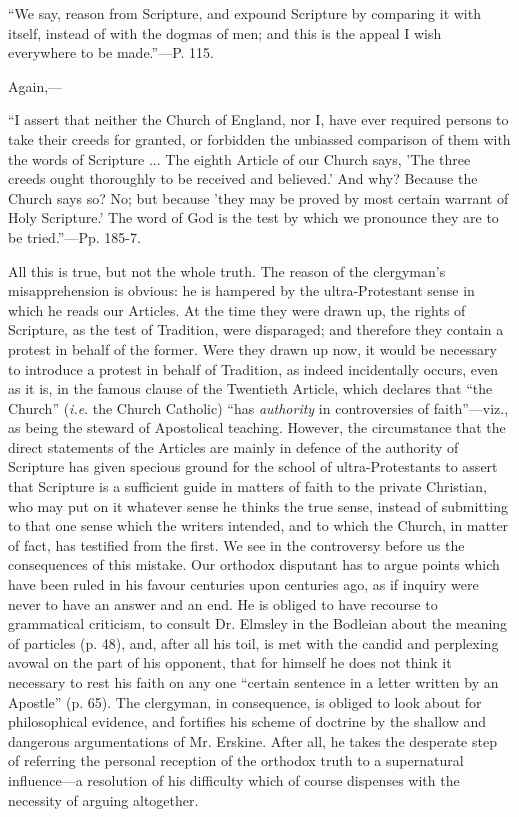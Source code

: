 ``We
say, reason from Scripture, and expound Scripture by comparing it with
itself, instead of with the dogmas of men; and this is the appeal I
wish everywhere to be made.''—P. 115.

Again,—

``I
assert that neither the Church of England, nor I, have ever required
persons to take their creeds for granted, or forbidden the unbiassed
comparison of them with the words of Scripture ... The eighth Article
of our Church says, 'The three creeds ought thoroughly to be received
and believed.' And why? Because the Church says so? No; but because
'they may be proved by most certain warrant of Holy Scripture.' The
word of God is the test by which we pronounce they are to be tried.''—Pp.
185-7.

All this is true, but not the whole truth. The
reason of the clergyman's misapprehension is obvious: he is hampered
by the ultra-Protestant sense in which he reads our Articles. At the
time they were drawn up, the rights of Scripture, as the test of
Tradition, were disparaged; and therefore they contain a protest in
behalf of the former. Were they drawn up now, it would be necessary to
introduce a protest in behalf of Tradition, as indeed incidentally
occurs, even as it is, in the famous clause of the Twentieth Article,
which declares that ``the Church'' (\emph{i.e}. the Church Catholic) ``has
\emph{authority} in controversies of faith''—viz., as being the
steward of Apostolical teaching. However, the circumstance that
the direct statements of the Articles are mainly in defence of the
authority of Scripture has given specious ground for the school of
ultra-Protestants to assert that Scripture is a sufficient guide in
matters of faith to the private Christian, who may put on it whatever
sense he thinks the true sense, instead of submitting to that one
sense which the writers intended, and to which the Church, in matter
of fact, has testified from the first. We see in the controversy
before us the consequences of this mistake. Our orthodox disputant has
to argue points which have been ruled in his favour centuries upon
centuries ago, as if inquiry were never to have an answer and an end.
He is obliged to have recourse to grammatical criticism, to consult
Dr. Elmsley in the Bodleian about the meaning of particles (p. 48),
and, after all his toil, is met with the candid and perplexing avowal
on the part of his opponent, that for himself he does not think it
necessary to rest his faith on any one ``certain sentence in a letter
written by an Apostle'' (p. 65). The clergyman, in consequence, is
obliged to look about for philosophical evidence, and fortifies his
scheme of doctrine by the shallow and dangerous argumentations of Mr.
Erskine. After all, he takes the desperate step of referring the
personal reception of the orthodox truth to a supernatural
influence—a resolution of his difficulty which of course dispenses
with the necessity of arguing altogether.

